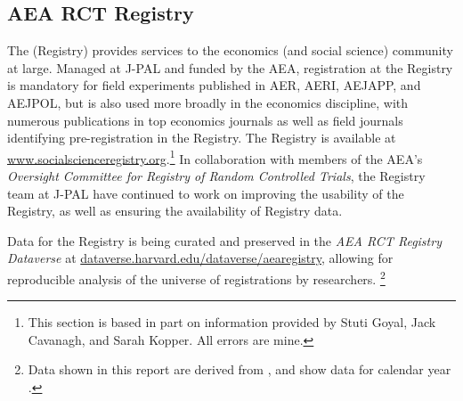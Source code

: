 
\subsection{AEA RCT Registry}
\label{sec:registry}

The \rctr{} (Registry) provides services to the economics (and social science) community at large. Managed at J-PAL and funded by the AEA, registration at the Registry is mandatory for field experiments published in \ac{AER}, \ac{AERI}, \ac{AEJAPP}, and \ac{AEJPOL}, but is also used more broadly in the economics discipline, with numerous publications in top economics journals as well as field journals identifying pre-registration in the Registry. The Registry is available at \href{https://www.socialscienceregistry.org/}{www.socialscienceregistry.org}.\footnote{This section is based in part on information provided by Stuti Goyal, Jack Cavanagh, and Sarah Kopper. All errors are mine.}
%
In collaboration with members of the AEA's \textit{Oversight Committee for Registry of Random Controlled Trials}, the Registry team at J-PAL have continued to work on improving the usability of the Registry, as well as ensuring the availability of Registry data. 


Data for the Registry is being curated and preserved in the \textit{AEA RCT Registry Dataverse} at 
\href{https://dataverse.harvard.edu/dataverse/aearegistry}{dataverse.harvard.edu/dataverse/aearegistry}, allowing for reproducible analysis of the universe of registrations by researchers.%
\footnote{Data shown in this report are derived from \citet{DVN/2RZF2X_2024}, and show data for calendar year \reportyear{}.  
} 




